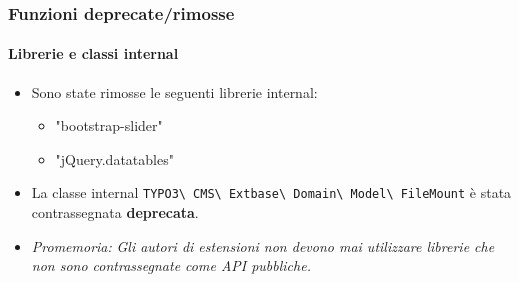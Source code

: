 \begin{frame}[fragile]
	\frametitle{Funzioni deprecate/rimosse}
	\framesubtitle{Librerie e classi internal}

	\begin{itemize}
		\item Sono state rimosse le seguenti librerie internal:
			\begin{itemize}
				\item "bootstrap-slider"
				\item "jQuery.datatables"
			\end{itemize}
			\vspace{0.4cm}

		\item La classe internal \small\texttt{TYPO3\textbackslash
			CMS\textbackslash
			Extbase\textbackslash
			Domain\textbackslash
			Model\textbackslash
			FileMount}\normalsize\newline
			è stata contrassegnata \textbf{deprecata}.

	\end{itemize}

	\vspace{0.6cm}
	\begin{itemize}
		\item[\ding{228}] \textit{Promemoria:} \textit{Gli autori di estensioni non devono mai utilizzare librerie che non sono contrassegnate come API pubbliche.}
	\end{itemize}

\end{frame}


